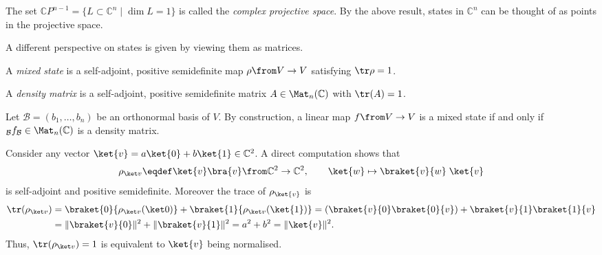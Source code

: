 \documentclass[a4paper,oneside, 12pt]{amsart}
\begin{document}
The set \( \mathbb{C}P^{n-1} =\{L \subset \mathbb{C}^{n}\mid \dim L = 1\} \) is called the \emph{complex projective space}.
By the above result, states in \( \mathbb{C}^{n}\) can be thought of as points in the projective space.
\bigskip

A different perspective on states is given by viewing them as matrices.

\begin{definition}\label{def:mixed-state-density-matrix}
  A \emph{mixed state} is a self-adjoint, positive semidefinite map \(\rho\from V\to V\) satisfying \(\tr \rho = 1\).

  A \emph{density matrix} is a self-adjoint, positive semidefinite matrix \(A \in \Mat_{n}( \mathbb{C})\) with \(\tr(A)=1\).
\end{definition}

\begin{remark}\label{rmk:density-matrices-are-mixed-states}
  Let \(\mathcal{B}=(b_{1}, \dots , b_{n})\) be an orthonormal basis of \(V\).
  By construction, a linear map \(f\from V\to V\) is a mixed state if and only if \(_{\mathcal{B}}f_{\mathcal{B}} \in \Mat_{n}(\mathbb{C})\) is a density matrix.
\end{remark}


Consider any  vector \(\ket{v}= a \ket{0} + b \ket{1} \in \mathbb{C}^{2}\).
A direct computation shows that
\begin{equation*}
  \rho_{\ket v}\eqdef\ket{v}\bra{v} \from \mathbb{C}^{2} \to \mathbb{C}^{2}, \qquad \ket{w} \mapsto \braket{v}{w}\; \ket{v}
\end{equation*}
is self-adjoint and positive semidefinite.
Moreover the trace of \(\rho_{\ket{v}}\) is
\begin{align*}
  \tr(\rho_{\ket v})
  & = \braket{0}{\rho_{\ket v}(\ket 0)} + \braket{1}{\rho_{\ket v}(\ket{1})}
    = (\braket{v}{0}\braket{0}{v}) + \braket{v}{1}\braket{1}{v} \\
  & = \|\braket{v}{0}\|^{2} + \|\braket{v}{1}\|^{2}
    = a^{2} + b^{2} = \|\ket{v}\|^{2}.
\end{align*}
Thus, \(\tr(\rho_{\ket v})=1\) is equivalent to \(\ket{v}\) being normalised.
\end{document}
